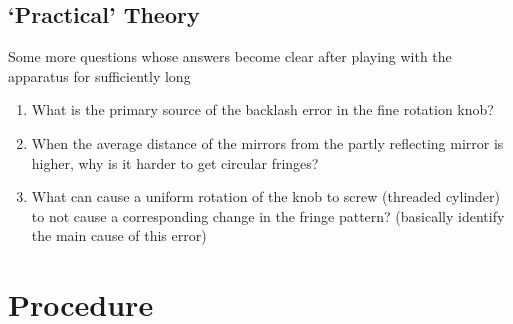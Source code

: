 	\subsection{`Practical' Theory}
		Some more questions whose answers become clear after playing with the apparatus for sufficiently long
		\begin{enumerate}
			\item What is the primary source of the backlash error in the fine rotation knob?
			\item When the average distance of the mirrors from the partly reflecting mirror is higher, why is it harder to get circular fringes?
			\item What can cause a uniform rotation of the knob to screw (threaded cylinder) to not cause a corresponding change in the fringe pattern? (basically identify the main cause of this error)
		\end{enumerate}
\section{Procedure}	
